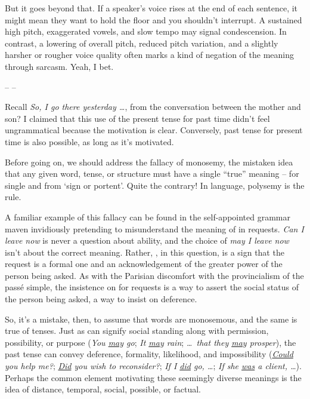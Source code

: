 But it goes beyond that. If a speaker's voice rises at the end of each sentence, it might mean they want to hold the floor and you shouldn't interrupt. A sustained high pitch, exaggerated vowels, and slow tempo may signal condescension. In contrast, a lowering of overall pitch, reduced pitch variation, and a slightly harsher or rougher voice quality often marks a kind of negation of the meaning through sarcasm. Yeah, I bet.


\begin{center}
    -- --
\end{center}

Recall \textit{So, I go there yesterday \dots}, from the conversation between the mother and son? I claimed that this use of the present tense for past time didn't feel ungrammatical because the motivation is clear. Conversely, past tense for present time is also possible, as long as it's motivated.

Before going on, we should address the fallacy of monosemy, the mistaken idea that any given word, tense, or structure must have a single \enquote{true} meaning --  for single and  from  `sign or portent'. Quite the contrary! In language, polysemy is the rule.

A familiar example of this fallacy can be found in the self-appointed grammar maven invidiously pretending to misunderstand the meaning of  in requests. \textit{Can I leave now} is never a question about ability, and the choice of \textit{may I leave now} isn't about the correct meaning. Rather, , in this question, is a sign that the request is a formal one and an acknowledgement of the greater power of the person being asked. As with the Parisian discomfort with the provincialism of the passé simple, the insistence on  for requests is a way to assert the social status of the person being asked, a way to insist on deference.

So, it's a mistake, then, to assume that words are monosemous, and the same is true of tenses. Just as  can signify social standing along with permission, possibility, or purpose (\textit{You \uline{may} go}; \textit{It \uline{may} rain}; \textit{\dots~that they \uline{may} prosper}), the past tense can convey deference, formality, likelihood, and impossibility (\textit{\uline{Could} you help me?}; \textit{\uline{Did} you wish to reconsider?}; \textit{If I \uline{did} go, \dots}; \textit{If she \uline{was} a client, \dots}). Perhaps the common element motivating these seemingly diverse meanings is the idea of distance, temporal, social, possible, or factual.

